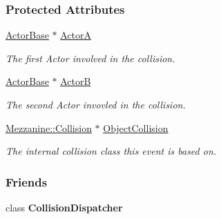\subsubsection*{Protected Attributes}
\begin{DoxyCompactItemize}
\item 
\hypertarget{classMezzanine_1_1EventCollision_a9e076c11df8b6e16c357f0a5c373542a}{
\hyperlink{classMezzanine_1_1ActorBase}{ActorBase} $\ast$ \hyperlink{classMezzanine_1_1EventCollision_a9e076c11df8b6e16c357f0a5c373542a}{ActorA}}
\label{classMezzanine_1_1EventCollision_a9e076c11df8b6e16c357f0a5c373542a}

\begin{DoxyCompactList}\small\item\em The first Actor involved in the collision. \item\end{DoxyCompactList}\item 
\hypertarget{classMezzanine_1_1EventCollision_aca0535fa8e9e4fbbb0229c6342e05da4}{
\hyperlink{classMezzanine_1_1ActorBase}{ActorBase} $\ast$ \hyperlink{classMezzanine_1_1EventCollision_aca0535fa8e9e4fbbb0229c6342e05da4}{ActorB}}
\label{classMezzanine_1_1EventCollision_aca0535fa8e9e4fbbb0229c6342e05da4}

\begin{DoxyCompactList}\small\item\em The second Actor invovled in the collision. \item\end{DoxyCompactList}\item 
\hypertarget{classMezzanine_1_1EventCollision_a562c1ab56444569b478a7a613caef42c}{
\hyperlink{classMezzanine_1_1Collision}{Mezzanine::Collision} $\ast$ \hyperlink{classMezzanine_1_1EventCollision_a562c1ab56444569b478a7a613caef42c}{ObjectCollision}}
\label{classMezzanine_1_1EventCollision_a562c1ab56444569b478a7a613caef42c}

\begin{DoxyCompactList}\small\item\em The internal collision class this event is based on. \item\end{DoxyCompactList}\end{DoxyCompactItemize}
\subsubsection*{Friends}
\begin{DoxyCompactItemize}
\item 
\hypertarget{classMezzanine_1_1EventCollision_aa4a13416efe17e957deb2cf4dcce3a60}{
class {\bfseries CollisionDispatcher}}
\label{classMezzanine_1_1EventCollision_aa4a13416efe17e957deb2cf4dcce3a60}

\end{DoxyCompactItemize}


